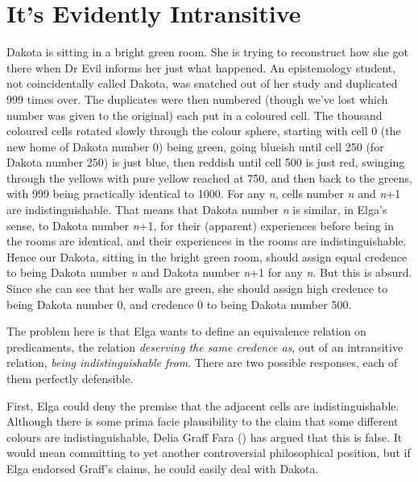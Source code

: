 \documentclass[
  10pt,
  letterpaper,
  DIV=11,
  numbers=noendperiod,
  twoside]{scrartcl}
\begin{document}
\section{It's Evidently Intransitive}\label{its-evidently-intransitive}

Dakota is sitting in a bright green room. She is trying to reconstruct
how she got there when Dr Evil informs her just what happened. An
epistemology student, not coincidentally called Dakota, was snatched out
of her study and duplicated 999 times over. The duplicates were then
numbered (though we've lost which number was given to the original) each
put in a coloured cell. The thousand coloured cells rotated slowly
through the colour sphere, starting with cell 0 (the new home of Dakota
number 0) being green, going blueish until cell 250 (for Dakota number
250) is just blue, then reddish until cell 500 is just red, swinging
through the yellows with pure yellow reached at 750, and then back to
the greens, with 999 being practically identical to 1000. For any
\emph{n}, cells number \emph{n} and \emph{n}+1 are indistinguishable.
That means that Dakota number \emph{n} is similar, in Elga's sense, to
Dakota number \emph{n}+1, for their (apparent) experiences before being
in the rooms are identical, and their experiences in the rooms are
indistinguishable. Hence our Dakota, sitting in the bright green room,
should assign equal credence to being Dakota number \emph{n} and Dakota
number \emph{n}+1 for any \emph{n}. But this is absurd. Since she can
see that her walls are green, she should assign high credence to being
Dakota number 0, and credence 0 to being Dakota number 500.

The problem here is that Elga wants to define an equivalence relation on
predicaments, the relation \emph{deserving the same credence as}, out of
an intransitive relation, \emph{being indistinguishable from}. There are
two possible responses, each of them perfectly defensible.

First, Elga could deny the premise that the adjacent cells are
indistinguishable. Although there is some prima facie plausibility to
the claim that some different colours are indistinguishable, Delia Graff
Fara () has argued that this is false. It
would mean committing to yet another controversial philosophical
position, but if Elga endorsed Graff's claims, he could easily deal with
Dakota.
\end{document}
